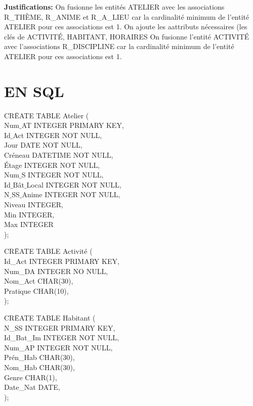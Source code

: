 \documentclass[a4paper,10.5pt]{report}
\begin{document}
	\textbf{Justifications: }
	On fusionne les entités ATELIER avec les associations R\_THÈME, R\_ANIME et R\_A\_LIEU car la cardinalité minimum de l'entité ATELIER pour ces associations est 1. On ajoute les aattributs nécessaires (les clés de ACTIVITÉ, HABITANT, HORAIRES
	On fusionne l'entité ACTIVITÉ avec l'associations R\_DISCIPLINE car la cardinalité minimum de l'entité ATELIER pour ces associations est 1.
	\newpage
    \section{EN SQL}

		\begin{tabbing}
			CR\=EATE TABLE Atelier (\\
			\> Num$\_$AT INTEGER PRIMARY KEY,\\
			\> Id$\_$Act INTEGER NOT NULL,\\
			\> Jour DATE NOT NULL,\\
			\> Créneau DATETIME NOT NULL,\\
			\> Étage INTEGER NOT NULL,\\
			\> Num$\_$S INTEGER NOT NULL,\\
			\> Id$\_$Bât$\_$Local INTEGER NOT NULL,\\
			\> N$\_$SS$\_$Anime  INTEGER NOT NULL,\\
			\> Niveau INTEGER,\\
			\> Min INTEGER,\\
			\> Max INTEGER\\);
		\end{tabbing}

		\begin{tabbing}
			CR\=EATE TABLE Activité (\\
			\> Id\_Act INTEGER PRIMARY KEY,\\
			\> Num\_DA INTEGER NO NULL,\\
			\> Nom\_Act CHAR(30),\\
			\> Pratique CHAR(10),\\);
		\end{tabbing}

		\begin{tabbing}
			CR\=EATE TABLE Habitant (\\
			\> N\_SS INTEGER PRIMARY KEY,\\
			\> Id\_Bat\_Im INTEGER NOT NULL,\\
			\> Num\_AP INTEGER NOT NULL,\\
			\> Prén\_Hab CHAR(30),\\
			\> Nom\_Hab CHAR(30),\\
			\> Genre CHAR(1),\\
			\> Date\_Nat DATE,\\);
		\end{tabbing}
\end{document}
